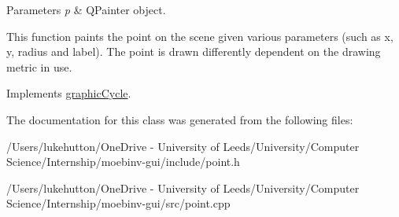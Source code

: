\begin{DoxyParams}{Parameters}
{\em p} & Q\+Painter object.\\
\hline
\end{DoxyParams}
This function paints the point on the scene given various parameters (such as x, y, radius and label). The point is drawn differently dependent on the drawing metric in use. 

Implements \mbox{\hyperlink{classgraphic_cycle}{graphic\+Cycle}}.



The documentation for this class was generated from the following files\+:\begin{DoxyCompactItemize}
\item 
/\+Users/lukehutton/\+One\+Drive -\/ University of Leeds/\+University/\+Computer Science/\+Internship/moebinv-\/gui/include/point.\+h\item 
/\+Users/lukehutton/\+One\+Drive -\/ University of Leeds/\+University/\+Computer Science/\+Internship/moebinv-\/gui/src/point.\+cpp\end{DoxyCompactItemize}
